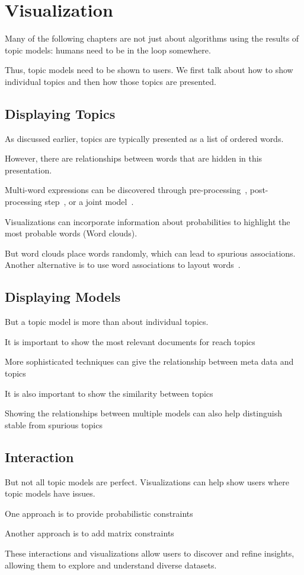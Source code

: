 

\chapter{Visualization}
\label{ch:viz}

Many of the following chapters are not just about algorithms using the
results of topic models: humans need to be in the loop somewhere.

Thus, topic models need to be shown to users.  We first talk about how
to show individual topics and then how those topics are presented.

\section{Displaying Topics}

As discussed earlier, topics are typically presented as a list of
ordered words.

However, there are relationships between words that are hidden in this
presentation.

Multi-word expressions can be discovered through
pre-processing~\cite{talley-11}, post-processing step~\cite{blei-09b},
or a joint model~\cite{johnson-10}.

Visualizations can incorporate information about probabilities to
highlight the most probable words (Word clouds).

But word clouds place words randomly, which can lead to spurious
associations.  Another alternative is to use word associations to
layout words~\cite{Smith:Chuang:Hu:Boyd-Graber:Findlater-2014}.

\section{Displaying Models}

But a topic model is more than about individual topics.

It is important to show the most relevant documents for reach
topics~\cite{chaney-12}

More sophisticated techniques can give the relationship between meta
data and topics~\cite{gardner-10,eistenstein-14}

It is also important to show the similarity between
topics~\cite{chuang-12}

Showing the relationships between multiple models can also help
distinguish stable from spurious topics~\cite{chuang-15} 

\section{Interaction}

But not all topic models are perfect.  Visualizations can help show
users where topic models have issues. 

One approach is to provide probabilistic constraints~\cite{hu-14:itm}

Another approach is to add matrix constraints~\cite{choo-13}

These interactions and visualizations allow users to discover and
refine insights, allowing them to explore and understand diverse
datasets.